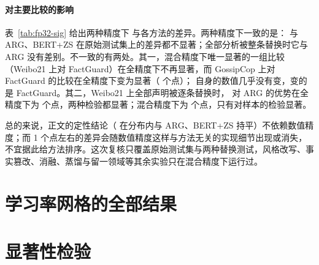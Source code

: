 \begin{table}[H]
\centering\small
\caption{主实验配置在混合精度（本文的协议）与全精度下的测试集 macro-F1（\%，相同的 5 个种子）。$p$ 值检验同一方法在两种精度下的差异。}\label{tab:fp32}
\end{table}

\paragraph{对主要比较的影响}
表~\ref{tab:fp32-sig} 给出两种精度下 \method{} 与各方法的差异。两种精度下一致的是：\method{} 与 ARG、BERT+ZS 在原始测试集上的差异都不显著；全部分析被整条替换时它与 ARG 没有差别。不一致的有两处。其一，混合精度下唯一显著的一组比较（Weibo21 上对 FactGuard）在全精度下不再显著，而 GossipCop 上对 FactGuard 的比较在全精度下变为显著（ 个点）；\method{} 自身的数值几乎没有变，变的是 FactGuard。其二，Weibo21 上全部声明被逐条替换时，\method{} 对 ARG 的优势在全精度下为  个点，两种检验都显著；混合精度下为  个点，只有对样本的检验显著。

总的来说，正文的定性结论（\method{} 在分布内与 ARG、BERT+ZS 持平）不依赖数值精度；而 1 个点左右的差异会随数值精度这样与方法无关的实现细节出现或消失，不宜据此给方法排序。这次复核只覆盖原始测试集与两种替换测试，风格改写、事实篡改、消融、蒸馏与留一领域等其余实验只在混合精度下运行过。

\begin{table}[H]
\centering\footnotesize
\setlength{\tabcolsep}{3pt}
\caption{两种精度下 \method{} 与各方法的 macro-F1 之差（\method{} 减去对方，百分点）与两种检验的 $p$ 值（5 个种子）。}\label{tab:fp32-sig}
\end{table}

\section{学习率网格的全部结果}

\begin{table}[H]
\centering\small
\caption{各方法在两个学习率下的验证集与测试集 macro-F1（5 个种子）。加粗的验证集数值对应被选中的配置。}\label{tab:grid}
\end{table}

\section{显著性检验}

